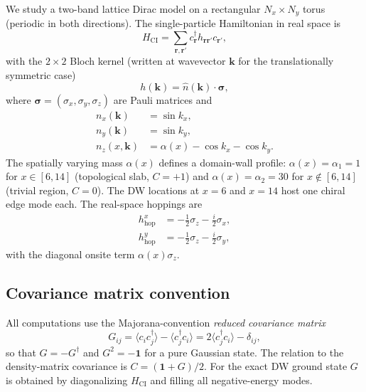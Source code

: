 \documentclass[aps,prb,twocolumn,superscriptaddress,floatfix]{revtex4-2}
\newcommand{\Nx}{N_x}
\newcommand{\Ny}{N_y}
\newcommand{\half}{\tfrac{1}{2}}
\newcommand{\Htop}{H_{\mathrm{CI}}}
\begin{document}
We study a two-band lattice Dirac model on a rectangular $\Nx \times \Ny$
torus (periodic in both directions).  The single-particle Hamiltonian in
real space is
\begin{equation}
  \Htop = \sum_{\mathbf{r},\mathbf{r}'} c^\dagger_{\mathbf{r}}
           h_{\mathbf{r}\mathbf{r}'} c_{\mathbf{r}'},
\end{equation}
with the $2\times 2$ Bloch kernel (written at wavevector $\mathbf{k}$
for the translationally symmetric case)
\begin{equation}
  h(\mathbf{k}) = \hat{n}(\mathbf{k}) \cdot \bm{\sigma},
  \label{eq:bloch}
\end{equation}
where $\bm{\sigma} = (\sigma_x, \sigma_y, \sigma_z)$ are Pauli matrices and
\begin{align}
  n_x(\mathbf{k}) &= \sin k_x, \\
  n_y(\mathbf{k}) &= \sin k_y, \\
  n_z(x,\mathbf{k}) &= \alpha(x) - \cos k_x - \cos k_y.
\end{align}
The spatially varying mass $\alpha(x)$ defines a domain-wall profile:
$\alpha(x) = \alpha_1 = 1$ for $x \in [6, 14]$ (topological slab,
$C = +1$) and $\alpha(x) = \alpha_2 = 30$ for $x \notin [6, 14]$
(trivial region, $C = 0$).  The DW locations at $x = 6$ and $x = 14$
host one chiral edge mode each. The real-space hoppings are
\begin{align}
  h^x_{\mathrm{hop}} &= -\half \sigma_z - \frac{i}{2}\sigma_x, \\
  h^y_{\mathrm{hop}} &= -\half \sigma_z - \frac{i}{2}\sigma_y,
\end{align}
with the diagonal onsite term $\alpha(x)\sigma_z$.

\subsection{Covariance matrix convention}

All computations use the Majorana-convention \emph{reduced covariance matrix}
\begin{equation}
  G_{ij} = \langle c_i c^\dagger_j \rangle - \langle c^\dagger_j c_i\rangle
          = 2\langle c^\dagger_j c_i\rangle - \delta_{ij},
\end{equation}
so that $G = -G^\dagger$ and $G^2 = -\mathbf{1}$ for a pure Gaussian state.
The relation to the density-matrix covariance is $C = (\mathbf{1} + G)/2$.
For the exact DW ground state $G$ is obtained by diagonalizing $\Htop$ and
filling all negative-energy modes.
\end{document}
